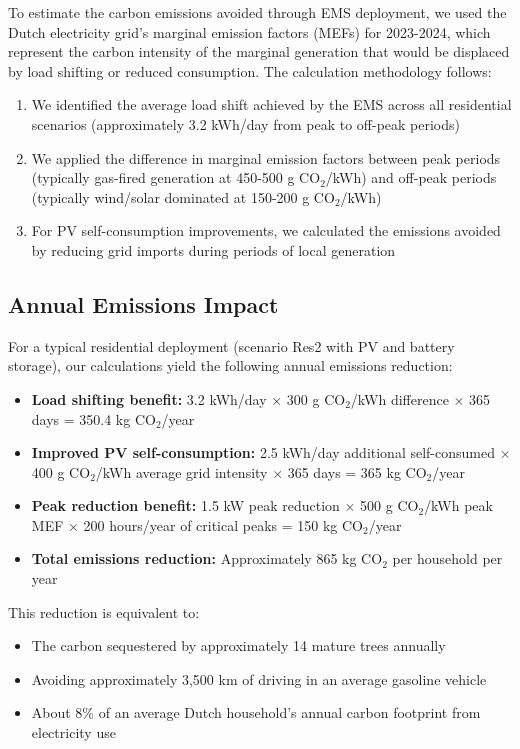 \documentclass[12pt,a4paper]{article}
\begin{document}
To estimate the carbon emissions avoided through EMS deployment, we used the Dutch electricity grid's marginal emission factors (MEFs) for 2023-2024, which represent the carbon intensity of the marginal generation that would be displaced by load shifting or reduced consumption. The calculation methodology follows:

\begin{enumerate}
    \item We identified the average load shift achieved by the EMS across all residential scenarios (approximately 3.2 kWh/day from peak to off-peak periods)
    \item We applied the difference in marginal emission factors between peak periods (typically gas-fired generation at 450-500 g CO$_2$/kWh) and off-peak periods (typically wind/solar dominated at 150-200 g CO$_2$/kWh)
    \item For PV self-consumption improvements, we calculated the emissions avoided by reducing grid imports during periods of local generation
\end{enumerate}

\subsection{Annual Emissions Impact}

For a typical residential deployment (scenario Res2 with PV and battery storage), our calculations yield the following annual emissions reduction:

\begin{itemize}
    \item \textbf{Load shifting benefit:} 3.2 kWh/day × 300 g CO$_2$/kWh difference × 365 days = 350.4 kg CO$_2$/year
    \item \textbf{Improved PV self-consumption:} 2.5 kWh/day additional self-consumed × 400 g CO$_2$/kWh average grid intensity × 365 days = 365 kg CO$_2$/year
    \item \textbf{Peak reduction benefit:} 1.5 kW peak reduction × 500 g CO$_2$/kWh peak MEF × 200 hours/year of critical peaks = 150 kg CO$_2$/year
    \item \textbf{Total emissions reduction:} Approximately 865 kg CO$_2$ per household per year
\end{itemize}

This reduction is equivalent to:
\begin{itemize}
    \item The carbon sequestered by approximately 14 mature trees annually
    \item Avoiding approximately 3,500 km of driving in an average gasoline vehicle
    \item About 8\% of an average Dutch household's annual carbon footprint from electricity use
\end{itemize}
\end{document}
